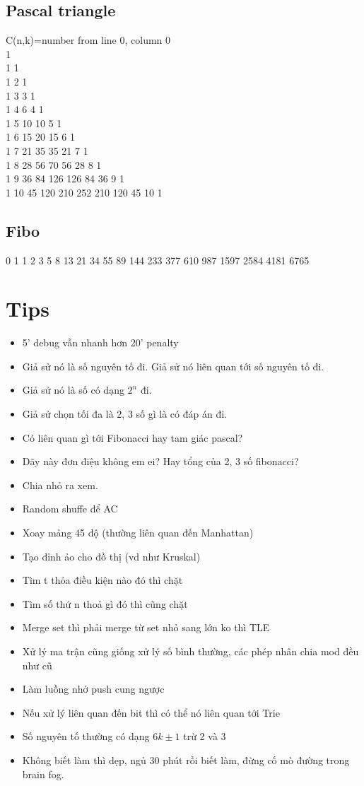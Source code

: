 \documentclass[a4paper, 12pt, oneside, landscape]{article}
\begin{document}
\begin{multicols}{2}
	\subsection{Pascal triangle}
C(n,k)=number from line 0, column 0\\
1\\
1 1\\
1 2 1\\ 
1 3 3 1\\ 
1 4 6 4 1\\ 
1 5 10 10 5 1\\ 
1 6 15 20 15 6 1\\ 
1 7 21 35 35 21 7 1\\
1 8 28 56 70 56 28 8 1\\ 
1 9 36 84 126 126 84 36 9 1\\
1 10 45 120 210 252 210 120 45 10 1
	\subsection{Fibo}
	0 1 1 2 3 5 8 13 21 34 55 89 144 233 377 610 987 1597 2584 4181 6765
	\section{Tips}
	\begin{itemize}[topsep=0pt, partopsep=0pt, itemsep=0pt]
	\item 5' debug vẫn nhanh hơn 20' penalty
	\item Giả sử nó là số nguyên tố đi. Giả sử nó liên quan tới số nguyên tố đi.
	\item Giả sử nó là số có dạng $2^n$ đi.
	\item Giả sử chọn tối đa là 2, 3 số gì là có đáp án đi.
	\item Có liên quan gì tới Fibonacci hay tam giác pascal?
	\item Dãy này đơn điệu không em ei? Hay tổng của 2, 3 số fibonacci?
	\item Chia nhỏ ra xem.
	\item Random shuffe để AC
	\item Xoay mảng 45 độ (thường liên quan đến Manhattan)
	\item Tạo đỉnh ảo cho đồ thị (vd như Kruskal)
	\item Tìm t thỏa điều kiện nào đó thì chặt
	\item Tìm số thứ n thoả gì đó thì cũng chặt
	\item Merge set thì phải merge từ set nhỏ sang lớn ko thì TLE
	\item Xử lý ma trận cũng giống xử lý số bình thường, các phép nhân chia mod đều như cũ
	\item Làm luồng nhớ push cung ngược
	\item Nếu xử lý liên quan đến bit thì có thể nó liên quan tới Trie
	\item Số nguyên tố thường có dạng $6k \pm 1$ trừ 2 và 3
	\item Không biết làm thì dẹp, ngủ 30 phút rồi biết làm, đừng cố mò đường trong brain fog.
	\end{itemize}

	\end{multicols}
\end{document}
